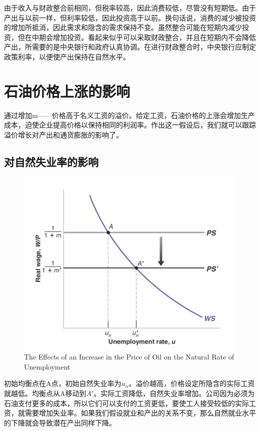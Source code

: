 \documentclass{article}
\begin{document}
由于收入与财政整合前相同，但税率较高，因此消费较低，尽管没有短期低。由于产出与以前一样，但利率较低，因此投资高于以前。换句话说，消费的减少被投资的增加所抵消，因此需求和隐含的需求保持不变。虽然整合可能在短期内减少投资，但在中期会增加投资。看起来似乎可以采取财政整合，并且在短期内不会降低产出，所需要的是中央银行和政府认真协调。在进行财政整合时，中央银行应制定政策利率，以便使产出保持在自然水平。

\section{石油价格上涨的影响}

通过增加m——价格高于名义工资的溢价。给定工资，石油价格的上涨会增加生产成本，迫使企业提高价格以保持相同的利润率。作出这一假设后，我们就可以跟踪溢价增长对产出和通货膨胀的影响了。

\subsection{对自然失业率的影响}

\begin{figure}[H] %
	\centering %
	\includegraphics[width=1\textwidth]{9_5} %
	\caption{The Effects of an Increase
		in the Price of Oil on
		the Natural Rate of
		Unemployment} %
	\label{Fig.main6} %
\end{figure}

初始均衡点在A点，初始自然失业率为$ u_n $。溢价越高，价格设定所隐含的实际工资就越低。均衡点从A移动到$ A' $。实际工资降低，自然失业率增加。公司因为必须为石油支付更多的成本，所以它们可以支付的工资更低，要使工人接受较低的实际工资，就需要增加失业率。如果我们假设就业和产出的关系不变，那么自然就业水平的下降就会导致潜在产出同样下降。
\end{document}
